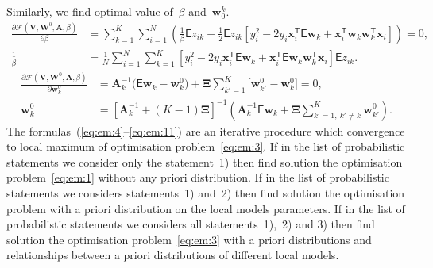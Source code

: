 \documentclass[12pt, twoside]{article}
\begin{document}
Similarly, we find optimal value of~$\beta$ and~$\textbf{w}_0^{k}$.
\[
\label{eq:em:10}
\begin{aligned}
\frac{\partial \mathcal{F}\left(\textbf{V}, \textbf{W}^{0}, \textbf{A}, \beta\right)}{\partial \beta} &= \sum_{k=1}^{K}\sum_{i=1}^{N}\left(\frac{1}{\beta}\mathsf{E}z_{ik}-\frac{1}{2}\mathsf{E}z_{ik}\left[y_{i}^{2}-2y_{i}\textbf{x}_{i}^{\mathsf{T}}\mathsf{E}\textbf{w}_{k}+\textbf{x}_{i}^{\mathsf{T}}\textbf{w}_{k}\textbf{w}_{k}^{\mathsf{T}}\textbf{x}_{i}\right]\right) = 0,\\
\frac{1}{\beta}&=\frac{1}{N}\sum_{i=1}^{N}\sum_{k=1}^{K}\left[y_{i}^{2}-2y_{i}\textbf{x}_{i}^{\mathsf{T}}\mathsf{E}\textbf{w}_{k} + \textbf{x}_{i}^{\mathsf{T}}\mathsf{E}\textbf{w}_{k}\textbf{w}_{k}^{\mathsf{T}}\textbf{x}_{i}\right]\mathsf{E}z_{ik}.
\end{aligned}
\]
\[
\label{eq:em:11}
\begin{aligned}
\frac{\partial \mathcal{F}\left(\textbf{V}, \textbf{W}^{0}, \textbf{A}, \beta\right)}{\partial \mathbf{w}_k^0} &= \mathbf{A}_k^{-1}\bigr(\mathsf{E}\mathbf{w}_k - \mathbf{w}_{k}^{0}\bigr) + \bm{\Xi}\sum_{k'=1}^{K}\bigr[\mathbf{w}_{k'}^{0} -\mathbf{w}_{k}^{0}\bigr] = 0,\\
\textbf{w}_{k}^{0} &=\left[\textbf{A}_{k}^{-1}+\left(K-1\right)\bm{\Xi}\right]^{-1}\left(\textbf{A}^{-1}_{k}\mathsf{E}\textbf{w}_{k}+\bm{\Xi}\sum_{k'=1,~k'\not=k}^{K}\textbf{w}_{k'}^{0}\right).
\end{aligned}
\]
The formulas~(\ref{eq:em:4}--\ref{eq:em:11}) are an iterative procedure which convergence to local maximum of optimisation problem~\eqref{eq:em:3}.
If in the list of probabilistic statements we consider only the statement~1) then find solution the optimisation problem~\eqref{eq:em:1} without any priori distribution.
If in the list of probabilistic statements we considers statements~1) and~2) then find solution the optimisation problem with a priori distribution on the local models parameters.
If in the list of probabilistic statements we considers all statements~1),~2) and 3) then find solution the optimisation problem~\eqref{eq:em:3} with a priori distributions and relationships between a priori distributions of different local models.
\end{document}
